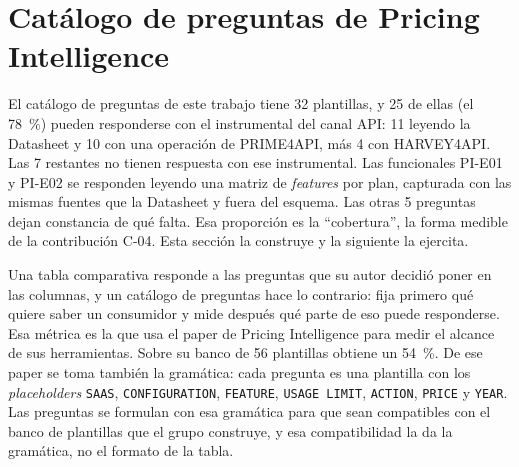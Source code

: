 \section{Catálogo de preguntas de Pricing Intelligence}
\label{sec:hallazgos:catalogo-pi}

El catálogo de preguntas de este trabajo tiene 32 plantillas, y 25 de ellas (el 78~\%)
pueden responderse con el instrumental del canal API: 11 leyendo la Datasheet y 10
con una operación de PRIME4API, más 4 con HARVEY4API. Las 7 restantes no tienen respuesta
con ese instrumental. Las funcionales PI-E01 y PI-E02 se responden leyendo
una matriz de \textit{features} por plan, capturada con las mismas fuentes que la
Datasheet y fuera del esquema. Las otras 5 preguntas dejan constancia de qué falta. Esa proporción es
la ``cobertura'', la forma medible de la contribución C-04. Esta sección la construye y
la siguiente la ejercita.

Una tabla comparativa responde a las preguntas que su autor decidió poner en las
columnas, y un catálogo de preguntas hace lo contrario: fija primero qué quiere saber
un consumidor y mide después qué parte de eso puede responderse. Esa métrica es la que
usa el paper de Pricing Intelligence \citep{cavero2026pricingintelligence} para medir
el alcance de sus herramientas. Sobre su banco de 56 plantillas obtiene un 54~\%. De
ese paper se toma también la gramática: cada pregunta es una plantilla con los
\textit{placeholders} \texttt{SAAS}, \texttt{CONFIGURATION}, \texttt{FEATURE},
\texttt{USAGE LIMIT}, \texttt{ACTION}, \texttt{PRICE} y \texttt{YEAR}. Las preguntas
se formulan con esa gramática para que sean compatibles con el banco de plantillas que
el grupo construye, y esa compatibilidad la da la gramática, no el formato de la tabla.

